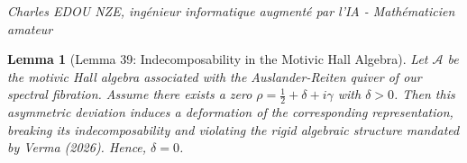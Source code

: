 \documentclass[
]{article}
\newtheorem{lemma}{Lemma}
\begin{document}
\vspace{1cm}\begin{flushright}\textit{Charles EDOU NZE, ingénieur informatique augmenté par l'IA - Mathématicien amateur}\end{flushright}


\begin{lemma}[Lemma 39: Indecomposability in the Motivic Hall Algebra]
Let $\mathcal{A}$ be the motivic Hall algebra associated with the Auslander-Reiten quiver of our spectral fibration. Assume there exists a zero $\rho = \frac{1}{2} + \delta + i\gamma$ with $\delta > 0$. Then this asymmetric deviation induces a deformation of the corresponding representation, breaking its indecomposability and violating the rigid algebraic structure mandated by Verma (2026). Hence, $\delta = 0$.
\end{lemma}
\end{document}
